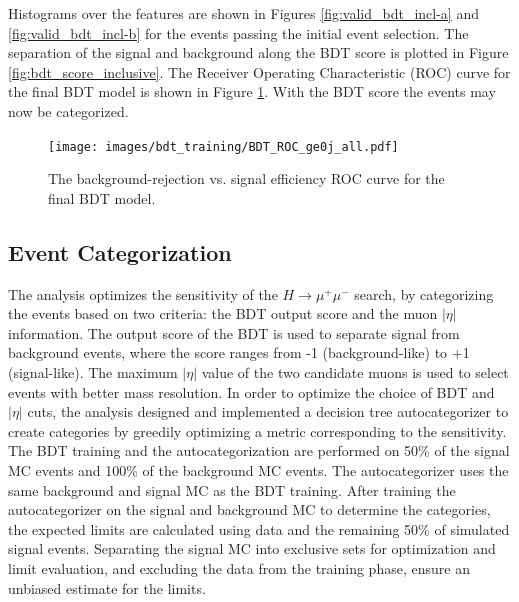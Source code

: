 Histograms over the features are shown in Figures \ref{fig:valid_bdt_incl-a} and \ref{fig:valid_bdt_incl-b} for the events passing the initial event selection. The separation of the signal and background along the BDT score is plotted in Figure \ref{fig:bdt_score_inclusive}. The Receiver Operating Characteristic (ROC) curve for the final BDT model is shown in Figure \ref{fig:BDT_ROC}. With the BDT score the events may now be categorized. 
\begin{figure}[h!]
  \texttt{[image: images/bdt\_training/BDT\_ROC\_ge0j\_all.pdf]}
  \caption[The BDT ROC score for signal vs background classification.]
  {The background-rejection vs. signal efficiency ROC curve for the final BDT model.} 
  \label{fig:BDT_ROC}
\end{figure}

\FloatBarrier
\subsection{Event Categorization}
\label{bdt_cats}

The analysis optimizes the sensitivity of the $H\rightarrow \mu^+\mu^-$ search, by categorizing the events
based on two criteria: the BDT output score and the muon $|\eta|$ information.
The output score of the BDT is used to separate signal
from background events, where the score ranges from -1 (background-like) to +1 (signal-like).
The maximum $|\eta|$ value of the two candidate muons is used to select events with better mass resolution. 
In order to optimize the choice of BDT and $|\eta|$ cuts, the analysis designed and implemented
a decision tree autocategorizer to create categories by greedily optimizing a metric corresponding
to the sensitivity. The BDT training and the autocategorization
are performed on 50\% of the signal MC events and 100\% of the background MC events. The autocategorizer uses the same background and signal MC as the BDT training.
After training the autocategorizer on the signal and background MC to determine the categories,
the expected limits are calculated using data and the remaining 50\% of simulated signal events. Separating the
signal MC into exclusive sets for optimization and limit evaluation, and excluding the data from the training phase, ensure an unbiased estimate for the limits.

